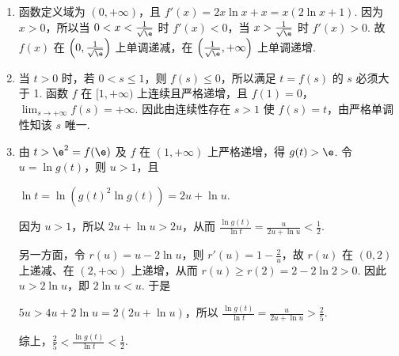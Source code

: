 \begin{solution}
\begin{enumerate}
\item 函数定义域为 \((0,+\infty)\)，且 \(f'(x)=2x\ln x+x=x(2\ln x+1)\). 因为 \(x>0\)，所以当 \(0<x<\frac{1}{\sqrt{\e}}\) 时 \(f'(x)<0\)，当 \(x>\frac{1}{\sqrt{\e}}\) 时 \(f'(x)>0\). 故 \(f(x)\) 在 \(\left(0,\frac{1}{\sqrt{\e}}\right)\) 上单调递减，在 \(\left(\frac{1}{\sqrt{\e}},+\infty\right)\) 上单调递增.

\item 当 \(t>0\) 时，若 \(0<s\leqslant1\)，则 \(f(s)\leqslant0\)，所以满足 \(t=f(s)\) 的 \(s\) 必须大于 1. 函数 \(f\) 在 \([1,+\infty)\) 上连续且严格递增，且 \(f(1)=0\)，\(\lim_{s\to+\infty}f(s)=+\infty\). 因此由连续性存在 \(s>1\) 使 \(f(s)=t\)，由严格单调性知该 \(s\) 唯一.

\item 由 \(t>\e^2=f(\e)\) 及 \(f\) 在 \((1,+\infty)\) 上严格递增，得 \(g(t)>\e\). 令 \(u=\ln g(t)\)，则 \(u>1\)，且

\(\ln t=\ln\left(g(t)^2\ln g(t)\right)=2u+\ln u\).

因为 \(u>1\)，所以 \(2u+\ln u>2u\)，从而 \(\frac{\ln g(t)}{\ln t}=\frac{u}{2u+\ln u}<\frac{1}{2}\).

另一方面，令 \(r(u)=u-2\ln u\)，则 \(r'(u)=1-\frac{2}{u}\)，故 \(r(u)\) 在 \((0,2)\) 上递减、在 \((2,+\infty)\) 上递增，从而 \(r(u)\geqslant r(2)=2-2\ln2>0\). 因此 \(u>2\ln u\)，即 \(2\ln u<u\). 于是

\(5u>4u+2\ln u=2(2u+\ln u)\)，所以 \(\frac{\ln g(t)}{\ln t}=\frac{u}{2u+\ln u}>\frac{2}{5}\).

综上，\(\frac{2}{5}<\frac{\ln g(t)}{\ln t}<\frac{1}{2}\).
\end{enumerate}
\end{solution}
